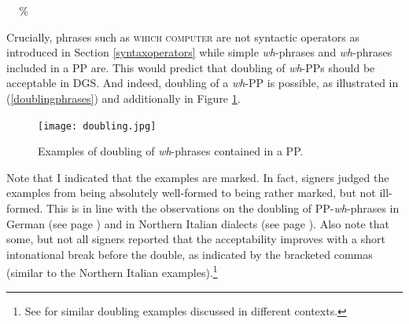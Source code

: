 \begin{exe}
\ex\label{whphrasesinappdgs}
\begin{xlist}
\ex \textcolor{white}{\%}
%
\ex \%
%
\end{xlist}
\end{exe}


\noindent Crucially, phrases such as \textsc{which computer} are not syntactic operators as introduced in Section \ref{syntaxoperators} while simple \textit{wh}-phrases and \textit{wh}-phrases included in a PP are. This would predict that doubling of \textit{wh}-PPs should be acceptable in DGS. And indeed, doubling of a \textit{wh}-PP is possible, as illustrated in (\ref{doublingphrases}) and additionally in Figure \ref{whdoublinggg}. 

\begin{figure}[bt]
\centering
	\texttt{[image: doubling.jpg]}
	\caption{Examples of doubling of \textit{wh}-phrases contained in a PP.}
	\label{whdoublinggg}
\end{figure}

Note that I indicated that the examples are marked. In fact, signers judged the examples from being absolutely well-formed to being rather marked, but not ill-formed. This is in line with the observations on the doubling of PP-\textit{wh}-phrases in German (see page \pageref{whcopyinggermanb}) and in Northern Italian dialects (see page \pageref{morenorthernitalianab}). Also note that some, but not all signers reported that the acceptability improves with a short intonational break before the double, as indicated by the bracketed commas (similar to the Northern Italian examples).\footnote{ See \citet[324--325]{happ2014vork} for similar doubling examples discussed in different contexts. } 


